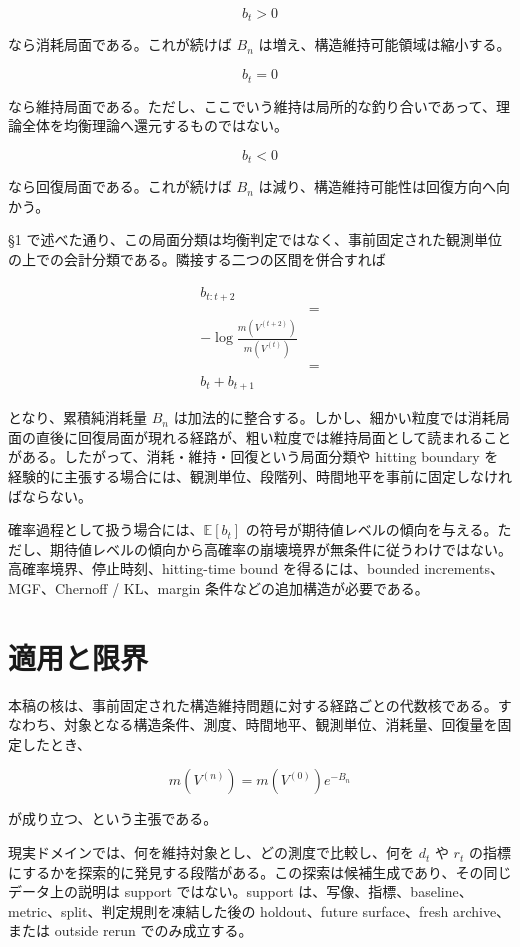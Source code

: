 \documentclass[12pt,a4paper]{article}
\begin{document}
\[
b_{t}>0
\]

なら消耗局面である。これが続けば \(B_{n}\) は増え、構造維持可能領域は縮小する。

\[
b_{t}=0
\]

なら維持局面である。ただし、ここでいう維持は局所的な釣り合いであって、理論全体を均衡理論へ還元するものではない。

\[
b_{t}<0
\]

なら回復局面である。これが続けば \(B_{n}\) は減り、構造維持可能性は回復方向へ向かう。

§1 で述べた通り、この局面分類は均衡判定ではなく、事前固定された観測単位の上での会計分類である。隣接する二つの区間を併合すれば

\[
\begin{aligned}
b_{t:t+2} \\
&= \\
-\log \frac{m(V^{(t+2)})}{m(V^{(t)})} \\
&= \\
b_{t}+b_{t+1}
\end{aligned}
\]

となり、累積純消耗量 \(B_{n}\) は加法的に整合する。しかし、細かい粒度では消耗局面の直後に回復局面が現れる経路が、粗い粒度では維持局面として読まれることがある。したがって、消耗・維持・回復という局面分類や hitting boundary を経験的に主張する場合には、観測単位、段階列、時間地平を事前に固定しなければならない。

確率過程として扱う場合には、\(\mathbb E[b_{t}]\) の符号が期待値レベルの傾向を与える。ただし、期待値レベルの傾向から高確率の崩壊境界が無条件に従うわけではない。高確率境界、停止時刻、hitting-time bound を得るには、bounded increments、MGF、Chernoff / KL、margin 条件などの追加構造が必要である。

\section{適用と限界}\label{ux9069ux7528ux3068ux9650ux754c}

本稿の核は、事前固定された構造維持問題に対する経路ごとの代数核である。すなわち、対象となる構造条件、測度、時間地平、観測単位、消耗量、回復量を固定したとき、

\[
m(V^{(n)}) = m(V^{(0)}) e^{-B_{n}}
\]

が成り立つ、という主張である。

現実ドメインでは、何を維持対象とし、どの測度で比較し、何を \(d_{t}\) や \(r_{t}\) の指標にするかを探索的に発見する段階がある。この探索は候補生成であり、その同じデータ上の説明は support ではない。support は、写像、指標、baseline、metric、split、判定規則を凍結した後の holdout、future surface、fresh archive、または outside rerun でのみ成立する。
\end{document}
